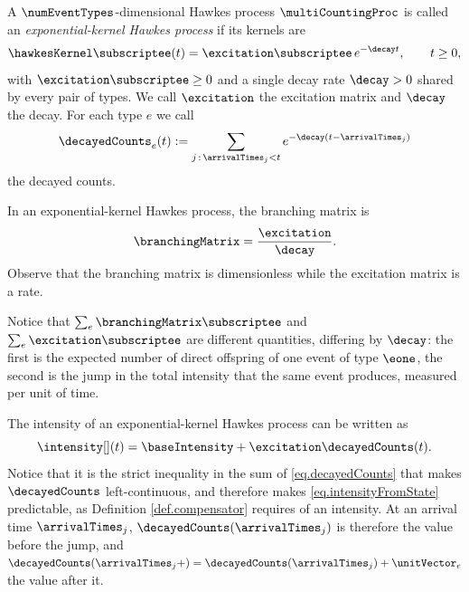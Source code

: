 \begin{defi}\label{def.exponentialHawkes}
 A $\numEventTypes$-dimensional Hawkes process $\multiCountingProc$ is called an
 \emph{exponential-kernel Hawkes process} if its kernels are
 \begin{equation}\label{eq.exponentialKernel}
  \hawkesKernel\subscriptee(t) = \excitation\subscriptee \, e^{-\decay t},
  \qquad t \geq 0,
 \end{equation}
 with $\excitation\subscriptee \geq 0$ and a single decay rate $\decay > 0$
 shared by every pair of types.
 We call $\excitation$ the excitation matrix and $\decay$ the decay.
 For each type $e$ we call
 \begin{equation}\label{eq.decayedCounts}
  \decayedCounts_e(t) := \sum_{j \, : \, \arrivalTimes_{j} < t}
  e^{-\decay (t - \arrivalTimes_{j})}
 \end{equation}
 the decayed counts.
\end{defi}

In an exponential-kernel Hawkes process, the branching matrix is 
\begin{equation}\label{eq.GammaIsAOverBeta}
 \branchingMatrix = \frac{\excitation}{\decay}.
\end{equation}
Observe that the branching matrix is dimensionless while the excitation matrix is a rate.

\begin{remark}\label{remark.countsAgainstRates}
 Notice that $\sum_e \branchingMatrix\subscriptee$ and $\sum_e \excitation\subscriptee$
 are different quantities, differing by $\decay$:
 the first is the expected number of direct offspring of one event of type $\eone$,
 the second is the jump in the total intensity that the same event produces,
 measured per unit of time.
\end{remark}


The intensity of an exponential-kernel Hawkes process can be written as
\begin{equation}\label{eq.intensityFromState}
 \intensity[ ](t) = \baseIntensity + \excitation \decayedCounts(t).
\end{equation}
Notice that it is the strict inequality in the sum of \eqref{eq.decayedCounts} that makes
$\decayedCounts$ left-continuous, and therefore makes \eqref{eq.intensityFromState}
predictable, as Definition \ref{def.compensator} requires of an intensity.
At an arrival time $\arrivalTimes_{j}$,
$\decayedCounts(\arrivalTimes_{j})$ is therefore the value before the jump,
and $\decayedCounts(\arrivalTimes_{j}+)
= \decayedCounts(\arrivalTimes_{j}) + \unitVector_e$
the value after it.

